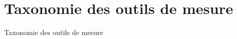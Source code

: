 \documentclass[compress]{beamer}
\begin{document}

\section{Taxonomie des outils de mesure}
\begin{frame}{Taxonomie des outils de mesure}

\end{frame}
\end{document}
